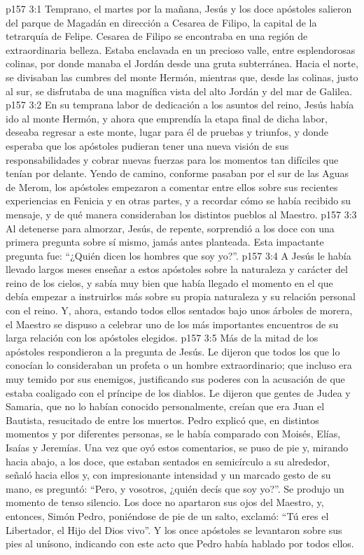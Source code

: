 \vs p157 3:1 Temprano, el martes por la mañana, Jesús y los doce apóstoles salieron del parque de Magadán en dirección a Cesarea de Filipo, la capital de la tetrarquía de Felipe. Cesarea de Filipo se encontraba en una región de extraordinaria belleza. Estaba enclavada en un precioso valle, entre esplendorosas colinas, por donde manaba el Jordán desde una gruta subterránea. Hacia el norte, se divisaban las cumbres del monte Hermón, mientras que, desde las colinas, justo al sur, se disfrutaba de una magnífica vista del alto Jordán y del mar de Galilea.
\vs p157 3:2 En su temprana labor de dedicación a los asuntos del reino, Jesús había ido al monte Hermón, y ahora que emprendía la etapa final de dicha labor, deseaba regresar a este monte, lugar para él de pruebas y triunfos, y donde esperaba que los apóstoles pudieran tener una nueva visión de sus responsabilidades y cobrar nuevas fuerzas para los momentos tan difíciles que tenían por delante. Yendo de camino, conforme pasaban por el sur de las Aguas de Merom, los apóstoles empezaron a comentar entre ellos sobre sus recientes experiencias en Fenicia y en otras partes, y a recordar cómo se había recibido su mensaje, y de qué manera consideraban los distintos pueblos al Maestro.
\vs p157 3:3 Al detenerse para almorzar, Jesús, de repente, sorprendió a los doce con una primera pregunta sobre sí mismo, jamás antes planteada. Esta impactante pregunta fue: “¿Quién dicen los hombres que soy yo?”.
\vs p157 3:4 \pc A Jesús le había llevado largos meses enseñar a estos apóstoles sobre la naturaleza y carácter del reino de los cielos, y sabía muy bien que había llegado el momento en el que debía empezar a instruirlos más sobre su propia naturaleza y su relación personal con el reino. Y, ahora, estando todos ellos sentados bajo unos árboles de morera, el Maestro se dispuso a celebrar uno de los más importantes encuentros de su larga relación con los apóstoles elegidos.
\vs p157 3:5 \pc Más de la mitad de los apóstoles respondieron a la pregunta de Jesús. Le dijeron que todos los que lo conocían lo consideraban un profeta o un hombre extraordinario; que incluso era muy temido por sus enemigos, justificando sus poderes con la acusación de que estaba coaligado con el príncipe de los diablos. Le dijeron que gentes de Judea y Samaria, que no lo habían conocido personalmente, creían que era Juan el Bautista, resucitado de entre los muertos. Pedro explicó que, en distintos momentos y por diferentes personas, se le había comparado con Moisés, Elías, Isaías y Jeremías. Una vez que oyó estos comentarios, se puso de pie y, mirando hacia abajo, a los doce, que estaban sentados en semicírculo a su alrededor, señaló hacia ellos y, con impresionante intensidad y un marcado gesto de su mano, es preguntó: “Pero, y vosotros, ¿quién decís que soy yo?”. Se produjo un momento de tenso silencio. Los doce no apartaron sus ojos del Maestro, y, entonces, Simón Pedro, poniéndose de pie de un salto, exclamó: “Tú eres el Libertador, el Hijo del Dios vivo”. Y los once apóstoles se levantaron sobre sus pies al unísono, indicando con este acto que Pedro había hablado por todos ellos.
